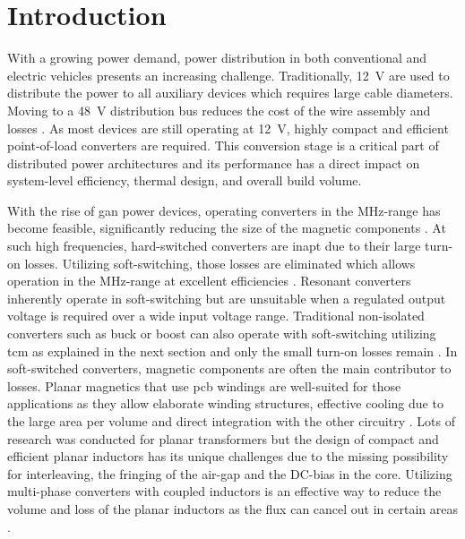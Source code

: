 \documentclass{IPEC2026}
\newcommand{\ac}{\gls}
\begin{document}
\section{Introduction}
With a growing power demand, power distribution in both conventional and electric vehicles presents an increasing challenge. Traditionally, \qty{12}{\V} are used to distribute the power to all auxiliary devices which requires large cable diameters. Moving to a \qty{48}{\V} distribution bus reduces the cost of the wire assembly and losses \cite{kumawatComprehensiveStudyAutomotive2019}. As most devices are still operating at \qty{12}{\V}, highly compact and efficient point-of-load converters are required. This conversion stage is a critical part of distributed power architectures and its performance has a direct impact on system-level efficiency, thermal design, and overall build volume. \par
With the rise of \ac{gan} power devices, operating converters in the MHz-range has become feasible, significantly reducing the size of the magnetic components \cite{weitzHighFrequencyResonant2023}. At such high frequencies, hard-switched converters are inapt due to their large turn-on losses. Utilizing soft-switching, those losses are eliminated which allows operation in the MHz-range at excellent efficiencies \cite{wangReviewHighFrequency2020}. Resonant converters inherently operate in soft-switching but are unsuitable when a regulated output voltage is required over a wide input voltage range. Traditional non-isolated converters such as buck or boost can also operate with soft-switching utilizing \ac{tcm} as explained in the next section and only the small turn-on losses remain \cite{marxgutInterleavedTriangularCurrent2010}.
In soft-switched converters, magnetic components are often the main contributor to losses. Planar magnetics that use \ac{pcb} windings are well-suited for those applications as they allow elaborate winding structures, effective cooling due to the large area per volume and direct integration with the other circuitry \cite{wangPCBWindingBasedCoupled2023, liHighFrequencyHigh2018, schaferNovelHighlyEfficient2020, caiOptimalDesignMegahertz2020}. Lots of research was conducted for planar transformers but the design of compact and efficient planar inductors has its unique challenges due to the missing possibility for interleaving, the fringing of the air-gap and the DC-bias in the core.
Utilizing multi-phase converters with coupled inductors is an effective way to reduce the volume and loss of the planar inductors as the flux can cancel out in certain areas \cite{huaUltrathinCoupledInductor2021}. \par
\end{document}
